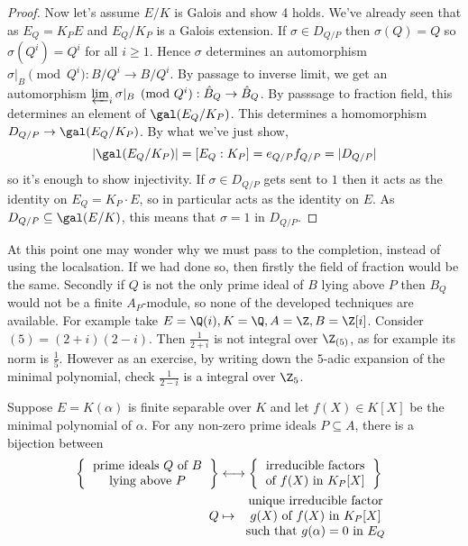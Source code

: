 \documentclass[a4paper]{article}
\begin{document}
\begin{proof}
  Now let's assume \(E/K\) is Galois and show 4 holds. We've already seen that as \(E_Q = K_P E\) and \(E_Q/K_P\) is a Galois extension. If \(\sigma \in D_{Q/P}\) then \(\sigma(Q) = Q\) so \(\sigma(Q^i) = Q^i\) for all \(i \geq 1\). Hence \(\sigma\) determines an automorphism \(\sigma|_B \pmod{Q^i}: B/Q^i \to B/Q^i\). By passage to inverse limit, we get an automorphism \(\varprojlim_i \sigma|_B \pmod{Q^i}: \hat B_Q \to \hat B_Q\). By passsage to fraction field, this determines an element of \(\gal(E_Q/K_P)\). This determines a homomorphism \(D_{Q/P} \to \gal(E_Q/K_P)\). By what we've just show,
  \[
    |\gal(E_Q/K_P)| = [E_Q: K_P] = e_{Q/P} f_{Q/P} = |D_{Q/P}|
  \]
  so it's enough to show injectivity. If \(\sigma \in D_{Q/P}\) gets sent to \(1\) then it acts as the identity on \(E_Q = K_P \cdot E\), so in particular acts as the identity on \(E\). As \(D_{Q/P} \subseteq \gal(E/K)\), this means that \(\sigma = 1\) in \(D_{Q/P}\).
\end{proof}

At this point one may wonder why we must pass to the completion, instead of using the localsation. If we had done so, then firstly the field of fraction would be the same. Secondly if \(Q\) is not the only prime ideal of \(B\) lying above \(P\) then \(B_Q\) would not be a finite \(A_P\)-module, so none of the developed techniques are available. For example take \(E = \Q(i), K = \Q, A = \Z, B = \Z[i]\). Consider \((5) = (2 + i)(2 - i)\). Then \(\frac{1}{2 + i}\) is not integral over \(\Z_{(5)}\), as for example its norm is \(\frac{1}{5}\). However as an exercise, by writing down the \(5\)-adic expansion of the minimal polynomial, check \(\frac{1}{2 - i}\) is a integral over \(\Z_5\).

\begin{corollary}
  Suppose \(E = K(\alpha)\) is finite separable over \(K\) and let \(f(X) \in K[X]\) be the minimal polynomial of \(\alpha\). For any non-zero prime ideals \(P \subseteq A\), there is a bijection between
  \begin{align*}
    \left\{
    \begin{tabular}{c}
      prime ideals \(Q\) of \(B\) \\
      lying above \(P\)
    \end{tabular}
    \right\}
    &\longleftrightarrow
      \left\{
      \begin{tabular}{c}
        irreducible factors \\
        of \(f(X)\) in \(K_P[X]\)
      \end{tabular}
      \right\}
    \\
    Q &\mapsto
        \begin{tabular}{c}
          unique irreducible factor \\
          \(g(X)\) of \(f(X)\) in \(K_P[X]\) \\
          such that \(g(\alpha) = 0\) in \(E_Q\)
        \end{tabular}
  \end{align*}
\end{corollary}
\end{document}
